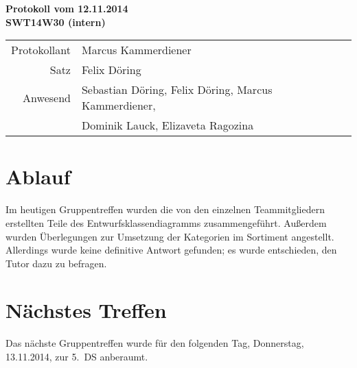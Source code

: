 \documentclass{scrartcl}
\begin{document}
\begin{center}
\LARGE \bf{Protokoll vom 12.11.2014 \\
SWT14W30 (intern)}
\end{center}

\begin{tabular}{rp{10cm}}
Protokollant & Marcus Kammerdiener \\
Satz & Felix Döring \\
Anwesend & Sebastian Döring, Felix Döring, Marcus Kammerdiener,\\
& Dominik Lauck, Elizaveta Ragozina \\
\end{tabular}

\vspace*{3em}

\section{Ablauf}
Im heutigen Gruppentreffen wurden die von den einzelnen Teammitgliedern erstellten Teile des Entwurfsklassendiagramms zusammengeführt.
Außerdem wurden Überlegungen zur Umsetzung der Kategorien im Sortiment angestellt. Allerdings wurde
keine definitive Antwort gefunden; es wurde entschieden, den Tutor dazu zu befragen.
\section{N\"achstes Treffen}
Das nächste Gruppentreffen wurde für den folgenden Tag, Donnerstag, 13.11.2014, zur 5.~DS anberaumt.
\end{document}
